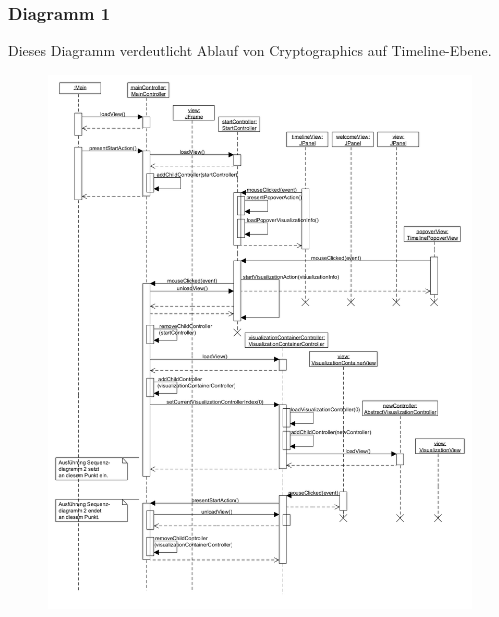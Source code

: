 \documentclass{article}
\begin{document}
\subsubsection{Diagramm 1}
	Dieses Diagramm verdeutlicht Ablauf von Cryptographics auf Timeline-Ebene.
	\begin{figure}[H]
        \centering
        \includegraphics[height=0.9\textheight]{resources/sequenceDiagram01}
      \end{figure}
      
\end{document}
